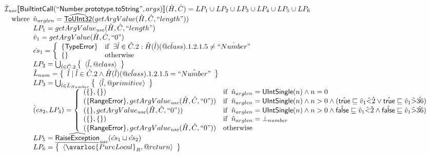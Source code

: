 \[
\begin{array}{l}


\aI_{\it use}\lbr \SF{BuiltintCall}(``\SF{Number.prototype.toString}",args)\rbr(\hat{H},\hat{C}) = LP_1 \cup LP_2 \cup LP_3 \cup LP_4 \cup LP_5 \cup LP_6\\
\quad\wherec{
  \hat{n}_{arglen} = \ahf{ToUInt32}(getArgValue(\hat{H}, \hat{C}, ``length"))\\
  LP_1 = getArgValue_{\it use}(\hat{H}, \hat{C}, ``length")\\
  \hat{v}_{1} = getArgValue(\hat{H}, \hat{C}, ``0")\\
  \hat{es}_1 = \left\{\begin{array}{ll}
      \{ \SF{TypeError} \}
      & \ifc{\exists\hat{l}\in\hat{C}.2: \hat{H}(\hat{l})(\avarprop{class}).1.2.1.5 \neq \hat{``Number"}}\\
      \set{} & \owc
    \end{array}\right.\\
  LP_2 = \bigcup_{\hat{l} \in \hat{C}.2} \set{\langle \hat{l},\varprop{class} \rangle}\\
  \hat{L}_{num} = \set{\hat{l} \mid \hat{l} \in \hat{C}.2 \land \hat{H}(\hat{l})(\avarprop{class}).1.2.1.5 = \hat{``Number"}}\\
  LP_3 = \bigcup_{\hat{l} \in \hat{L}_{Number}} \set{\langle \hat{l},\varprop{primitive} \rangle}\\
  \hat({es}_2, LP_4) = \left\{\begin{array}{ll}
      (\{ \}, \set{}) & \ifc{\hat{n}_{arglen} = \SF{UIntSingle}(n) \land n = 0}\\
      (\{ \SF{RangeError} \}, getArgValue_{\it use}(\hat{H}, \hat{C}, ``0"))
      & \ifc{\hat{n}_{arglen} = \SF{UIntSingle}(n) \land n > 0 
        \land (\atrue \sqsubseteq \hat{v}_1 \hat{<} \hat{2} \lor \atrue \sqsubseteq \hat{v}_1 \hat{>} \hat{36} )}\\
      (\{ \}, getArgValue_{\it use}(\hat{H}, \hat{C}, ``0"))
      & \ifc{\hat{n}_{arglen} = \SF{UIntSingle}(n) \land n > 0 
        \land \afalse \sqsubseteq \hat{v}_1 \hat{<} \hat{2} \land \afalse \sqsubseteq \hat{v}_1 \hat{>} \hat{36} )}\\
      (\{ \}, \set{}) & \ifc{\hat{n}_{arglen} = \bot_{number}}\\
      (\{ \SF{RangeError} \}, getArgValue_{\it use}(\hat{H}, \hat{C}, ``0")) & \owc
    \end{array}\right.\\
  LP_5 = \ahf{RaiseException}_{\it use}(\hat{es}_1 \sqcup \hat{es}_2)\\
  LP_6 = \set{\langle\avarloc{PureLocal}_R,\varprop{return}\rangle}\\
  }\\
\\



\end{array}\]
